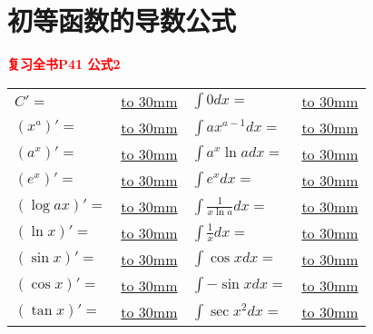 \documentclass[a4paper]{ctexart}
\begin{document}
\section{初等函数的导数公式}
\textcolor{red}{\textbf{复习全书P41 \quad 公式2}}

\begin{center}
\renewcommand\arraystretch{1.5}
    \begin{tabular}{  l  l  l  l }
        $C'=$                           &
        \underline{\hbox to 30mm{}}     & 
        $\int{0dx}=$                    &
        \underline{\hbox to 30mm{}}     \\


        $(x^a)'=$                       &
        \underline{\hbox to 30mm{}}     & 
        $\int{ ax^{a-1} dx}=$           &
        \underline{\hbox to 30mm{}}     \\

        $(a^x)'=$                        &
        \underline{\hbox to 30mm{}}     & 
        $\int{ a^x\ln{a}dx}=$            &
        \underline{\hbox to 30mm{}}     \\

        $(e^x)'=$                       &
        \underline{\hbox to 30mm{}}     & 
        $\int{e^x dx}=$                  &
        \underline{\hbox to 30mm{}}     \\

        $(\log{a}{x})'=$                &
        \underline{\hbox to 30mm{}}     & 
        $\int{\frac{1}{x\ln{a}}dx}=$    &
        \underline{\hbox to 30mm{}}     \\

        $(\ln{x})'=$                    &
        \underline{\hbox to 30mm{}}     &
        $\int{\frac{1}{x}dx}=$          &
        \underline{\hbox to 30mm{}}     \\


        $(\sin{x})'=$                   &
        \underline{\hbox to 30mm{}}     & 
        $\int{\cos{x}dx}=$              &
        \underline{\hbox to 30mm{}}     \\

        $(\cos{x})'=$                   &
        \underline{\hbox to 30mm{}}     & 
        $\int{-\sin{x}dx}=$             &
        \underline{\hbox to 30mm{}}     \\

        $(\tan{x})'=$                   &
        \underline{\hbox to 30mm{}}     & 
        $\int{\sec{x}^2dx} = $          &
        \underline{\hbox to 30mm{}}     \\


\end{tabular}
\end{center}
\end{document}
